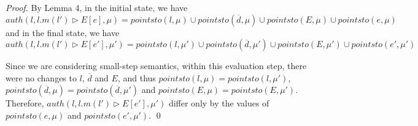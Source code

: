 \documentclass{llncs}
\begin{document}
\begin{proof} By Lemma 4, in the initial state, we have
\[
auth(l, l.m(l') \rhd E[e], \mu) = pointsto(l, \mu) \cup pointsto(\overline{d}, \mu) \cup pointsto(E, \mu) \cup pointsto(e, \mu)
\]
and in the final state, we have
\[
auth(l, l.m(l') \rhd E[e'], \mu') = pointsto(l, \mu') \cup pointsto(\overline{d}, \mu') \cup pointsto(E, \mu') \cup pointsto(e', \mu')
\]

Since we are considering small-step semantics, within this evaluation step, there were no changes to $l$, $\overline{d}$ and $E$, and thus $pointsto(l, \mu) = pointsto(l, \mu')$, $pointsto(\overline{d}, \mu) = pointsto(\overline{d}, \mu')$ and $pointsto(E, \mu) = pointsto(E, \mu')$. Therefore, $auth(l, l.m(l') \rhd E[e'], \mu')$ differ only by the values of $pointsto(e, \mu)$ and $pointsto(e', \mu')$. \qed

\end{proof}

\newpage
\end{document}
